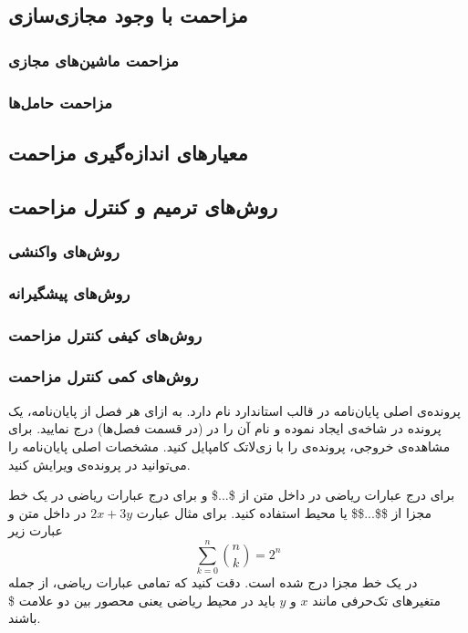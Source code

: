 \subsection{مزاحمت با وجود مجازی‌سازی}
\subsubsection{مزاحمت ماشین‌های مجازی}
\subsubsection{مزاحمت حامل‌ها}
\subsection{معیارهای اندازه‌گیری مزاحمت}
\subsection{روش‌های ترمیم و کنترل مزاحمت}
\subsubsection{روش‌های واکنشی}
\subsubsection{روش‌های پیشگیرانه}
\subsubsection{روش‌های کیفی کنترل مزاحمت}
\subsubsection{روش‌های کمی کنترل مزاحمت}


پرونده‌ی اصلی پایان‌نامه در قالب استاندارد
  نام دارد.
به ازای هر فصل از پایان‌نامه، یک پرونده در شاخه‌ی  ایجاد نموده
و نام آن را در   (در قسمت فصل‌ها) درج نمایید.
برای مشاهده‌ی خروجی، پرونده‌ی  را با زی‌لاتک کامپایل کنید.
مشخصات اصلی پایان‌نامه را می‌توانید در پرونده‌ی  ویرایش کنید.

برای درج عبارات ریاضی در داخل متن از \$...\$ و 
برای درج عبارات ریاضی در یک خط مجزا از \$\$...\$\$ یا محیط  
استفاده کنید. برای مثال عبارت 
$2x + 3y$
در داخل متن و عبارت زیر
\begin{equation}
\sum_{k=0}^{n} \binom{n}{k} = 2^n
\end{equation}
در یک خط مجزا درج شده است. 
دقت کنید که تمامی عبارات ریاضی، از جمله متغیرهای تک‌حرفی مانند $x$ و $y$ باید در محیط ریاضی 
یعنی محصور بین دو علامت \$ باشند. 

